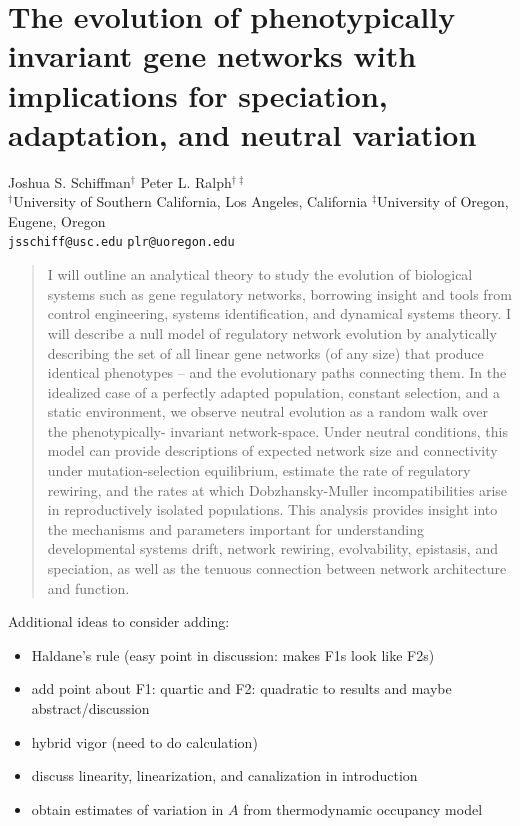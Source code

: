 \documentclass{article}
\newcommand{\1}{\mathbbm{1}}
\begin{document}
\section*{The evolution of phenotypically invariant gene networks with implications for speciation, adaptation, and neutral variation}
{\centering
Joshua S. Schiffman$^{\dagger}$ \qquad Peter L. Ralph$^{\dagger \ddagger}$ \\
$^{\dagger}$University of Southern California, Los Angeles, California \qquad $^{\ddagger}$University of Oregon, Eugene, Oregon \\
\texttt{jsschiff@usc.edu} \qquad \texttt{plr@uoregon.edu}
\\
}



\begin{abstract}
I will outline an analytical theory to study the evolution of biological systems such as gene regulatory networks, borrowing insight and tools from control engineering, systems identification, and dynamical systems theory. I will describe a null model of regulatory network evolution by analytically describing the set of all linear gene networks (of any size) that produce identical phenotypes -- and the evolutionary paths connecting them. In the idealized case of a perfectly adapted population, constant selection, and a static environment, we observe neutral evolution as a random walk over the phenotypically- invariant network-space. Under neutral conditions, this model can provide descriptions of expected network size and connectivity under mutation-selection equilibrium, estimate the rate of regulatory rewiring, and the rates at which Dobzhansky-Muller incompatibilities arise in reproductively isolated populations. This analysis provides insight into the mechanisms and parameters important for understanding developmental systems drift, network rewiring, evolvability, epistasis, and speciation, as well as the tenuous connection between network architecture and function. 
\end{abstract}

Additional ideas to consider adding:
\begin{itemize}
    \item Haldane's rule (easy point in discussion: makes F1s look like F2s)
    \item add point about F1: quartic and F2: quadratic to results and maybe abstract/discussion
    \item hybrid vigor (need to do calculation)
    \item discuss linearity, linearization, and canalization in introduction
    \item obtain estimates of variation in $A$ from thermodynamic occupancy model
\end{itemize}
\end{document}
